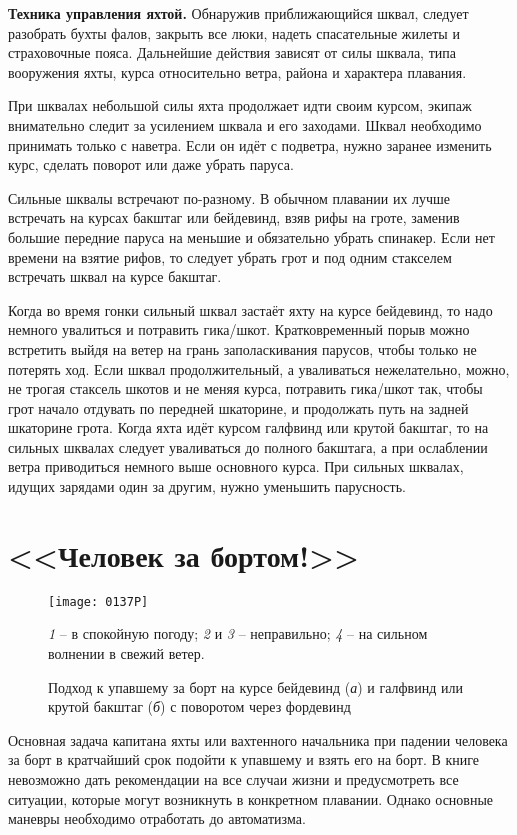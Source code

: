 \textbf{Техника управления яхтой.} Обнаружив приближающийся шквал,
следует разобрать бухты фалов, закрыть все люки, надеть спасательные
жилеты и страховочные пояса. Дальнейшие действия зависят от силы
шквала, типа вооружения яхты, курса относительно ветра, района и
характера плавания.

При шквалах небольшой силы яхта продолжает идти своим курсом, экипаж
внимательно следит за усилением шквала и его заходами. Шквал
необходимо принимать только с наветра. Если он идёт с подветра, нужно
заранее изменить курс, сделать поворот или даже убрать паруса.

Сильные шквалы встречают по-разному. В обычном плавании их лучше
встречать на курсах бакштаг или бейдевинд, взяв рифы на гроте, заменив
большие передние паруса на меньшие и обязательно убрать спинакер. Если
нет времени на взятие рифов, то следует убрать грот и под одним
стакселем встречать шквал на курсе бакштаг.

Когда во время гонки сильный шквал застаёт яхту на курсе бейдевинд, то
надо немного увалиться и потравить гика\-/шкот. Кратковременный порыв
можно встретить выйдя на ветер на грань заполаскивания парусов, чтобы
только не потерять ход. Если шквал продолжительный, а уваливаться
нежелательно, можно, не трогая стаксель шкотов и не меняя курса,
потравить гика\-/шкот так, чтобы грот начало отдувать по передней
шкаторине, и продолжать путь на задней шкаторине грота. Когда яхта
идёт курсом галфвинд или крутой бакштаг, то на сильных шквалах следует
уваливаться до полного бакштага, а при ослаблении ветра приводиться
немного выше основного курса. При сильных шквалах, идущих зарядами
один за другим, нужно уменьшить парусность.

\section{<<Человек за бортом!>>}

\begin{figure*}[!h]
  \centering{}
  \texttt{[image: 0137P]}
  \caption{Подход к упавшему за борт на курсе бейдевинд (\textit{а}) и галфвинд или крутой бакштаг (\textit{б}) с поворотом через фордевинд}
  \label{fig:137}
  \small
  \centering{}
  \textit{1} \--- в спокойную погоду; \textit{2} и \textit{3} \--- неправильно; \textit{4} \--- на сильном волнении в свежий ветер.
\end{figure*}

Основная задача капитана яхты или вахтенного начальника при падении
человека за борт в кратчайший срок подойти к упавшему и взять его на
борт. В книге невозможно дать рекомендации на все случаи жизни и
предусмотреть все ситуации, которые могут возникнуть в конкретном
плавании. Однако основные маневры необходимо отработать до
автоматизма.

